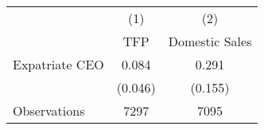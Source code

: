 \begin{tabular}{l*{2}{c}}
\hline\hline
                    &\multicolumn{1}{c}{(1)}&\multicolumn{1}{c}{(2)}\\
                    &\multicolumn{1}{c}{TFP}&\multicolumn{1}{c}{Domestic Sales}\\
\hline
Expatriate CEO      &       0.084&       0.291\\
                    &     (0.046)&     (0.155)\\
\hline
Observations        &        7297&        7095\\
\hline\hline
\end{tabular}

